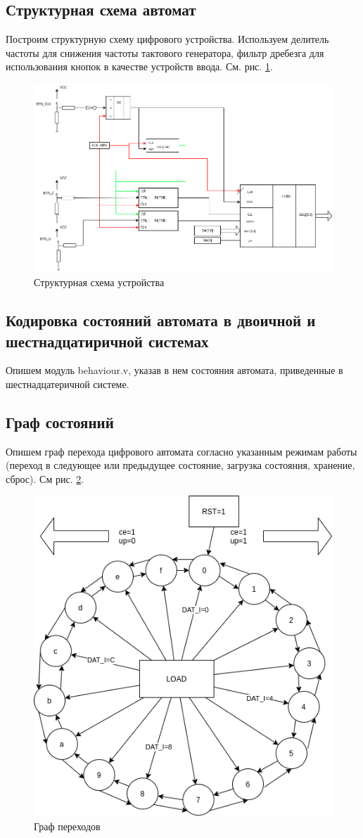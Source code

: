 \documentclass[a4paper,14pt]{extarticle}
\begin{document}
\subsection{Структурная схема автомат}
Построим структурную схему цифрового устройства. Используем делитель частоты для снижения частоты тактового генератора, фильтр дребезга для использования кнопок в качестве устройств ввода. См. рис. \ref{fig:fsm-struct}.
\begin{figure}[htpb]
	\centering
	\includegraphics[width=0.7\linewidth]{images/fsm-struct}
	\caption{Структурная схема  устройства}
	\label{fig:fsm-struct}
\end{figure}


\subsection{Кодировка состояний автомата в двоичной и шестнадцатиричной системах}
Опишем модуль behaviour.v, указав в нем состояния автомата, приведенные в шестнадцатеричной системе.



\newpage
\subsection{Граф состояний}
Опишем граф перехода цифрового автомата согласно указанным режимам работы (переход в следующее или предыдущее состояние, загрузка состояния, хранение, сброс). См рис. \ref{fig:graph}.
\begin{figure}[htbp]
	\centering
	\includegraphics[width=0.4\linewidth]{images/graph}
	\caption{Граф переходов}
	\label{fig:graph}
\end{figure}
\end{document}
